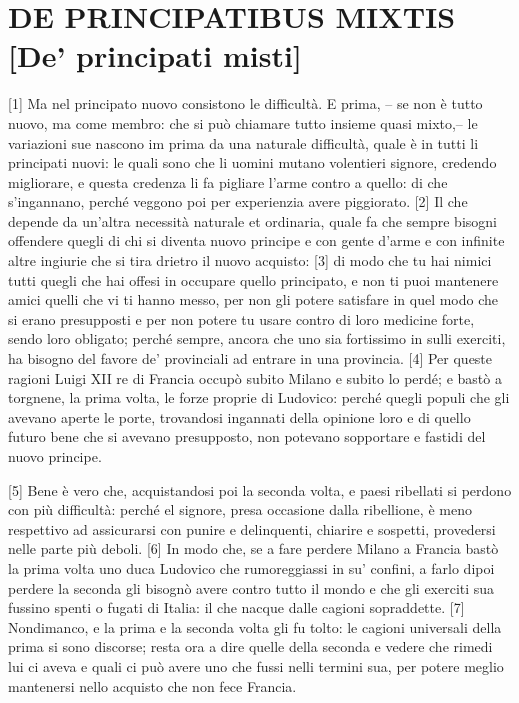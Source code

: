 \quebra\section{DE PRINCIPATIBUS MIXTIS
{[}De' principati misti{]}}

{[}1{]} Ma nel principato nuovo consistono le difficultà. E prima, -- se
non è tutto nuovo, ma come membro: che si può chiamare tutto insieme
quasi mixto,-- le variazioni sue nascono im prima da una naturale
difficultà, quale è in tutti li principati nuovi: le quali sono che li
uomini mutano volentieri signore, credendo migliorare, e questa credenza
li fa pigliare l'arme contro a quello: di che s'ingannano, perché
veggono poi per experienzia avere piggiorato. {[}2{]} Il che depende da
un'altra necessità naturale et ordinaria, quale fa che sempre bisogni
offendere quegli di chi si diventa nuovo principe e con gente d'arme e
con infinite altre ingiurie che si tira drietro il nuovo acquisto:
{[}3{]} di modo che tu hai nimici tutti quegli che hai offesi in
occupare quello principato, e non ti puoi mantenere amici quelli che vi
ti hanno messo, per non gli potere satisfare in quel modo che si erano
presupposti e per non potere tu usare contro di loro medicine forte,
sendo loro obligato; perché sempre, ancora che uno sia fortissimo in
sulli exerciti, ha bisogno del favore de' provinciali ad entrare in una
provincia. {[}4{]} Per queste ragioni Luigi XII re di Francia occupò
subito Milano e subito lo perdé; e bastò a torgnene, la prima volta, le
forze proprie di Ludovico: perché quegli populi che gli avevano aperte
le porte, trovandosi ingannati della opinione loro e di quello futuro
bene che si avevano presupposto, non potevano sopportare e fastidi del
nuovo principe.

{[}5{]} Bene è vero che, acquistandosi poi la seconda volta, e paesi
ribellati si perdono con più difficultà: perché el signore, presa
occasione dalla ribellione, è meno respettivo ad assicurarsi con punire
e delinquenti, chiarire e sospetti, provedersi nelle parte più deboli.
{[}6{]} In modo che, se a fare perdere Milano a Francia bastò la prima
volta uno duca Ludovico che rumoreggiassi in su' confini, a farlo dipoi
perdere la seconda gli bisognò avere contro tutto il mondo e che gli
exerciti sua fussino spenti o fugati di Italia: il che nacque dalle
cagioni sopraddette. {[}7{]} Nondimanco, e la prima e la seconda volta
gli fu tolto: le cagioni universali della prima si sono discorse; resta
ora a dire quelle della seconda e vedere che rimedi lui ci aveva e quali
ci può avere uno che fussi nelli termini sua, per potere meglio
mantenersi nello acquisto che non fece Francia.

